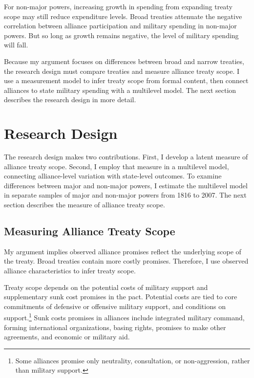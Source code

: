 \documentclass[12pt]{article}
\begin{document}
For non-major powers, increasing growth in spending from expanding treaty scope may still reduce expenditure levels. 
Broad treaties attenuate the negative correlation between alliance participation and military spending in non-major powers. 
But so long as growth remains negative, the level of military spending will fall. 


Because my argument focuses on differences between broad and narrow treaties, the research design must compare treaties and measure alliance treaty scope.  
I use a measurement model to infer treaty scope from formal content, then connect alliances to state military spending with a multilevel model. 
The next section describes the research design in more detail. 



\section{Research Design} 


The research design makes two contributions. 
First, I develop a latent measure of alliance treaty scope. 
Second, I employ that measure in a multilevel model, connecting alliance-level variation with state-level outcomes. 
To examine differences between major and non-major powers, I estimate the multilevel model in separate samples of major and non-major powers from 1816 to 2007. 
The next section describes the measure of alliance treaty scope. 


\subsection{Measuring Alliance Treaty Scope} 


My argument implies observed alliance promises reflect the underlying scope of the treaty. 
Broad treaties contain more costly promises. 
Therefore, I use observed alliance characteristics to infer treaty scope.


Treaty scope depends on the potential costs of military support and supplementary sunk cost promises in the pact. 
Potential costs are tied to core commitments of defensive or offensive military support, and conditions on support.\footnote{Some alliances promise only neutrality, consultation, or non-aggression, rather than military support.}  
Sunk costs promises in alliances include integrated military command, forming international organizations, basing rights, promises to make other agreements, and economic or military aid. 
\end{document}
